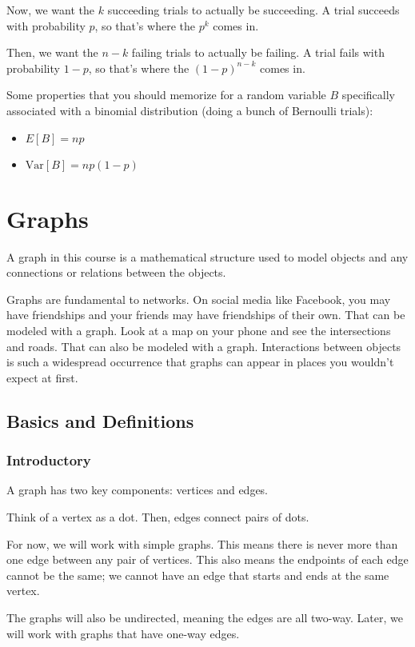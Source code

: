 \documentclass[11pt]{scrartcl}
\begin{document}
Now, we want the $k$ succeeding trials to actually be succeeding. A trial succeeds with probability $p$, so that's where the $p^k$ comes in.

Then, we want the $n-k$ failing trials to actually be failing. A trial fails with probability $1-p$, so that's where the $(1-p)^{n-k}$ comes in.

Some properties that you should memorize for a random variable $B$ specifically associated with a binomial distribution (doing a bunch of Bernoulli trials):
\begin{itemize}
\item $E[B] = np$
\item $\text{Var}[B] = np(1-p)$
\end{itemize}

\section{Graphs}

A graph in this course is a mathematical structure used to model objects and any connections or relations between the objects.

Graphs are fundamental to networks. On social media like Facebook, you may have friendships and your friends may have friendships of their own. That can be modeled with a graph. Look at a map on your phone and see the intersections and roads. That can also be modeled with a graph. Interactions between objects is such a widespread occurrence that graphs can appear in places you wouldn't expect at first.

\subsection{Basics and Definitions}

\subsubsection{Introductory}

A graph has two key components: vertices and edges.

Think of a vertex as a dot. Then,  edges connect pairs of dots.

For now, we will work with simple graphs. This means there is never more than one edge between any pair of vertices. This also means the endpoints of each edge cannot be the same; we cannot have an edge that starts and ends at the same vertex.

The graphs will also be undirected, meaning the edges are all two-way. Later, we will work with graphs that have one-way edges.
\end{document}
